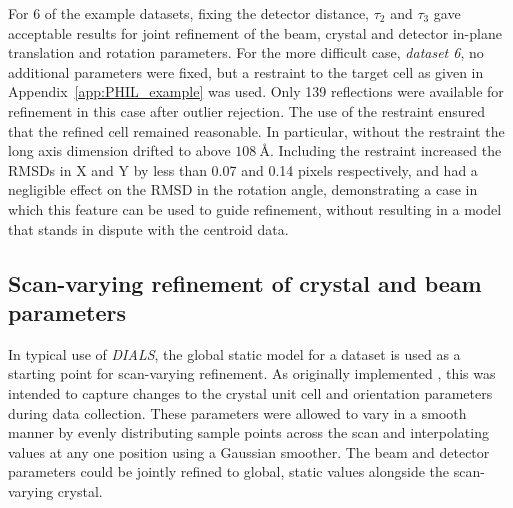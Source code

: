 \documentclass[preprint]{iucr}
\newcommand{\dials}{\emph{DIALS}\xspace}
\begin{document}
For 6 of the example datasets, fixing the detector distance, $\tau_2$ and $\tau_3$
gave acceptable results for joint refinement of the beam, crystal and detector
in-plane translation and rotation parameters. For the more difficult case,
\emph{dataset 6}, no additional parameters were fixed, but a restraint to
the target cell as given in Appendix~\ref{app:PHIL_example} was used. Only 139
reflections were available for refinement in this case after outlier rejection.
The use of the restraint ensured that the refined cell remained reasonable. In
particular, without the restraint the long axis dimension drifted to above
$\SI{108}{\angstrom}$. Including the restraint increased the RMSDs in X and Y
by less than 0.07 and 0.14 pixels respectively, and had a negligible effect on
the RMSD in the rotation angle, demonstrating a case in which this feature can
be used to guide refinement, without resulting in a model that stands in dispute
with the centroid data.

\subsection{Scan-varying refinement of crystal and beam parameters
\label{sec:sv-refinement}}

In typical use of \dials, the global static model for a dataset is used as a
starting point for scan-varying refinement. As originally implemented
\cite{Waterman2016}, this was intended to capture changes to the crystal unit
cell and orientation parameters during data collection. These parameters were
allowed to vary in a smooth manner by evenly distributing sample points across
the scan and interpolating values at any one position using a Gaussian
smoother. The beam and detector parameters could be jointly refined to global,
static values alongside the scan-varying crystal.
\end{document}
